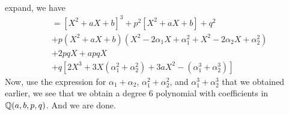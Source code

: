 \documentclass{article}
\begin{document}
\begin{homeworkProblem}
\begin{align}
\end{align}
expand, we have
\begin{align}
    & = [X^2 + aX + b]^3 + p^2 [ X^2 + aX + b] + q^2\\
    & + p(X^2 + a X + b)(X^2 -2 \alpha_1 X + \alpha_1^2 + X^2 - 2 \alpha_2 X + \alpha_2^2)\\
    & + 2pqX + apqX\\
    & + q[ 2X^3 + 3X(\alpha_1^2 + \alpha_2^2) + 3aX^2 - (\alpha_1^3 + \alpha_2^3)]
\end{align}
Now, use the expression for $\alpha_1 + \alpha_2$, $\alpha_1^2 + \alpha_2^2$, and $\alpha_1^3 + \alpha_2^3$ that we obtained earlier, we see that we obtain 
a degree 6 polynomial with coefficients in $\mathbb{Q} (a,b,p,q)$. And we are done.
    
    

\end{homeworkProblem}
\end{document}
